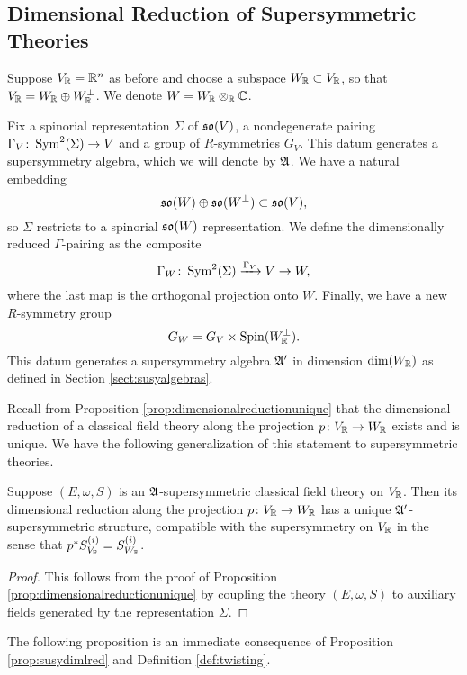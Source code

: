 \documentclass[10pt, oneside]{article}
\begin{document}
\subsection{Dimensional Reduction of Supersymmetric Theories}

Suppose $V_\mathbb R=\mathbb R^n$ as before and choose a subspace $W_\mathbb R\subset V_\mathbb R$, so that $V_\mathbb R = W_\mathbb R\oplus W^\perp_\mathbb R$. We denote $W=W_{\mathbb R}\otimes_{\mathbb R} \mathbb C$.

Fix a spinorial representation $\Sigma$ of $\mathfrak{so}(V)$, a nondegenerate pairing $\Gamma_V\colon \operatorname{Sym}^2(\Sigma)\rightarrow V$ and a group of $R$-symmetries $G_V$.  This datum generates a supersymmetry algebra, which we will denote by $\mathfrak{A}$.  We have a natural embedding
\[\mathfrak{so}(W)\oplus \mathfrak{so}(W^{\perp})\subset \mathfrak{so}(V),\]
so $\Sigma$ restricts to a spinorial $\mathfrak{so}(W)$ representation. We define the dimensionally reduced $\Gamma$-pairing as the composite
\[\Gamma_W\colon \operatorname{Sym}^2(\Sigma)\xrightarrow{\Gamma_V} V\rightarrow W,\]
where the last map is the orthogonal projection onto $W$. Finally, we have a new $R$-symmetry group
\[G_W = G_V\times \mathrm{Spin}(W^\perp_\mathbb R).\]
This datum generates a supersymmetry algebra $\mathfrak{A}'$ in dimension $\mathrm{dim}(W_\mathbb R)$ as defined in Section \ref{sect:susyalgebras}.

Recall from Proposition \ref{prop:dimensionalreductionunique} that the dimensional reduction of a classical field theory along the projection $p\colon V_\mathbb R\rightarrow W_\mathbb R$ exists and is unique. We have the following generalization of this statement to supersymmetric theories.

\begin{prop} \label{prop:susydimlred}
Suppose $(E, \omega, S)$ is an $\mathfrak{A}$-supersymmetric classical field theory on $V_\mathbb R$. Then its dimensional reduction along the projection $p\colon V_\mathbb R\rightarrow W_\mathbb R$ has a unique $\mathfrak{A}'$-supersymmetric structure, compatible with the supersymmetry on $V_\mathbb R$ in the sense that $p^*S^{(i)}_{V_\mathbb R} = S^{(i)}_{W_\mathbb R}$.
\end{prop}

\begin{proof}
This follows from the proof of Proposition \ref{prop:dimensionalreductionunique} by coupling the theory $(E, \omega, S)$ to auxiliary fields generated by the representation $\Sigma$.
\end{proof}

The following proposition is an immediate consequence of Proposition \ref{prop:susydimlred} and Definition \ref{def:twisting}.
\end{document}
